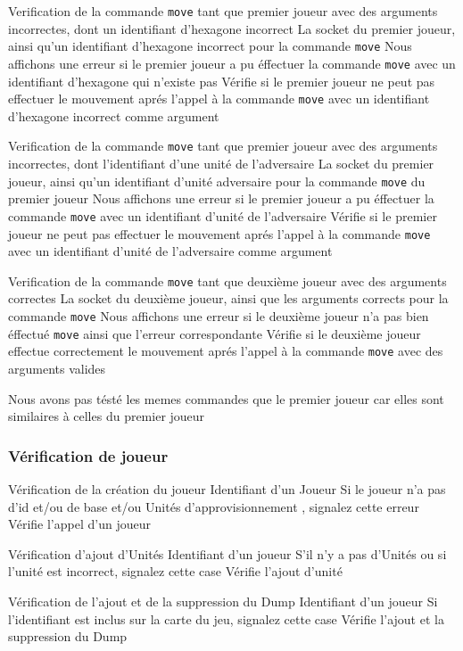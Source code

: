 \mytest
{Verification de la commande {\tt move} tant que premier joueur avec des arguments incorrectes, dont un identifiant d'hexagone incorrect}
{La socket du premier joueur, ainsi qu'un identifiant d'hexagone incorrect pour la commande {\tt move}}
{Nous affichons une erreur si le premier joueur a pu éffectuer la commande {\tt move} avec un identifiant d'hexagone qui n'existe pas}
{Vérifie si le premier joueur ne peut pas effectuer le mouvement aprés l'appel à la commande {\tt move} avec un identifiant d'hexagone incorrect comme argument}

\mytest
{Verification de la commande {\tt move} tant que premier joueur avec des arguments incorrectes, dont l'identifiant d'une unité de l'adversaire}
{La socket du premier joueur, ainsi qu'un identifiant d'unité adversaire pour la commande {\tt move} du premier joueur}
{Nous affichons une erreur si le premier joueur a pu éffectuer la commande {\tt move} avec un identifiant d'unité de l'adversaire}
{Vérifie si le premier joueur ne peut pas effectuer le mouvement aprés l'appel à la commande {\tt move} avec un identifiant d'unité de l'adversaire comme argument}

\mytest
{Verification de la commande {\tt move} tant que deuxième joueur avec des arguments correctes}
{La socket du deuxième joueur, ainsi que les arguments corrects pour la commande {\tt move}}
{Nous affichons une erreur si le deuxième joueur n'a pas bien éffectué {\tt move} ainsi que l'erreur correspondante}
{Vérifie si le deuxième joueur effectue correctement le mouvement aprés l'appel à la commande {\tt move} avec des arguments valides}

Nous avons pas tésté les memes commandes que le premier joueur car elles sont similaires à celles du premier joueur



\subsubsection{Vérification de joueur}

\mytest
{Vérification de la création du joueur }
{Identifiant d'un Joueur}
{Si le joueur n'a pas d'id et/ou de base et/ou Unités d'approvisionnement , signalez cette erreur}
{Vérifie l'appel d'un joueur}


\mytest
{Vérification d'ajout d'Unités }
{Identifiant d'un joueur}
{S'il n'y a pas d'Unités ou si l'unité est incorrect, signalez cette case}
{Vérifie l'ajout d'unité}


\mytest
{Vérification de l'ajout et de la suppression du Dump }
{Identifiant d'un joueur}
{Si l'identifiant est inclus sur la carte du jeu, signalez cette case}
{Vérifie l'ajout et la suppression du Dump}


